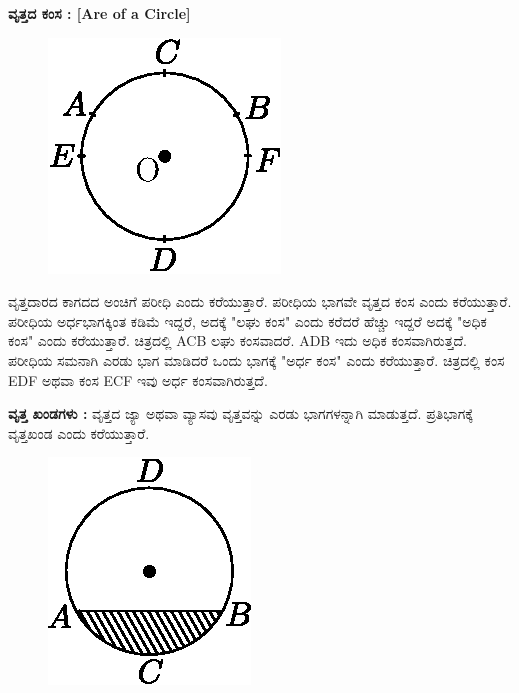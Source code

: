 \medskip
\noindent
\textbf{ವೃತ್ತದ ಕಂಸ : [Are of a Circle]}
\begin{figure}[H]
\centering
\includegraphics[scale=.98]{src/figure/chap1/fig1-25.eps}
\end{figure}
 
 ವೃತ್ತದಾರದ ಕಾಗದದ ಅಂಚಿಗೆ ಪರೀಧಿ ಎಂದು ಕರೆಯುತ್ತಾರೆ. ಪರೀಧಿಯ ಭಾಗವೇ ವೃತ್ತದ ಕಂಸ ಎಂದು ಕರೆಯುತ್ತಾರೆ. ಪರೀಧಿಯ ಅರ್ಧಭಾಗಕ್ಕಿಂತ ಕಡಿಮೆ ಇದ್ದರೆ, ಅದಕ್ಕೆ "ಲಘು ಕಂಸ" ಎಂದು ಕರೆದರೆ ಹೆಚ್ಚು ಇದ್ದರೆ ಅದಕ್ಕೆ "ಅಧಿಕ ಕಂಸ" ಎಂದು ಕರೆಯುತ್ತಾರೆ. ಚಿತ್ರದಲ್ಲಿ ACB ಲಘು ಕಂಸವಾದರೆ. ADB ಇದು ಅಧಿಕ ಕಂಸವಾಗಿರುತ್ತದೆ. ಪರೀಧಿಯ ಸಮನಾಗಿ ಎರಡು ಭಾಗ ಮಾಡಿದರೆ ಒಂದು ಭಾಗಕ್ಕೆ "ಅರ್ಧ ಕಂಸ" ಎಂದು ಕರೆಯುತ್ತಾರೆ. ಚಿತ್ರದಲ್ಲಿ ಕಂಸ  EDF ಅಥವಾ ಕಂಸ  ECF ಇವು ಅರ್ಧ ಕಂಸವಾಗಿರುತ್ತದೆ. 
 
 \medskip
 
 \noindent
   \textbf{ವೃತ್ತ ಖಂಡಗಳು :} ವೃತ್ತದ ಜ್ಯಾ ಅಥವಾ ವ್ಯಾಸವು ವೃತ್ತವನ್ನು ಎರಡು ಭಾಗಗಳನ್ನಾಗಿ ಮಾಡುತ್ತದೆ. ಪ್ರತಿಭಾಗಕ್ಕೆ ವೃತ್ತಖಂಡ ಎಂದು ಕರೆಯುತ್ತಾರೆ. 
  \begin{figure}[H]
\centering
\includegraphics[scale=.98]{src/figure/chap1/fig1-26.eps}
\end{figure}
 
